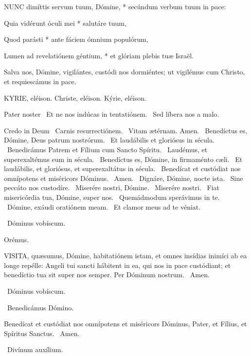 \lettrine[lines=2]{N}{UNC} dimíttis servum tuum, Dómine, * secúndum verbum tuum in pace:

Quia vidérunt óculi mei * salutáre tuum,

Quod parásti * ante fáciem ómnium populórum,

Lumen ad revelatiónem géntium, * et glóriam plebis tuæ Israël.

 Salva nos, Dómine, vigilántes, custódi nos dormiéntes; ut vigilémus cum Christo, et requiescámus in pace.



KYRIE, eléison. Christe, eléison. Kýrie, eléison.

Pater noster  \V\ Et ne nos indúcas in tentatiónem. \R\ Sed líbera nos a malo.

Credo in Deum  \V\ Carnis resurrectiónem. \R\ Vitam ætérnam. Amen. \V\ Benedíctus es, Dómine, Deus patrum nostrórum. \R\ Et laudábilis et gloriósus in sécula. \V\ Benedicámus Patrem et Fílium cum Sancto Spíritu. \R\ Laudémus, et superexaltémus eum in sécula. \V\ Benedíctus es, Dómine, in firmaménto cæli. \R\ Et laudábilis, et gloriósus, et superexaltátus in sécula. \V\ Benedícat et custódiat nos omnípotens et miséricors Dóminus. \R\ Amen. \V\ Dignáre, Dómine, nocte ista. \R\ Sine peccáto nos custodíre. \V\ Miserére nostri, Dómine. \R\ Miserére nostri. \V\ Fiat misericórdia tua, Dómine, super nos. \R\ Quemádmodum sperávimus in te. \V\ Dómine, exáudi oratiónem meam. \R\ Et clamor meus ad te véniat.

\sectionornament

\V\ Dóminus vobíscum.

Orémus. 

\lettrine[lines=2]{V}{ISITA}, quæsumus, Dómine, habitatiónem istam, et omnes insídias inimíci ab ea longe repélle: Angeli tui sancti hábitent in ea, qui nos in pace custódiant; et benedíctio tua sit super nos semper. Per Dóminum nostrum. \R\ Amen.

\V\ Dóminus vobíscum.

\V\ Benedicámus Dómino.

 Benedícat et custódiat nos omnípotens et miséricors Dóminus, Pater, et Fílius, et Spíritus Sanctus. \R\ Amen.


\V\ Divínum auxílium.

